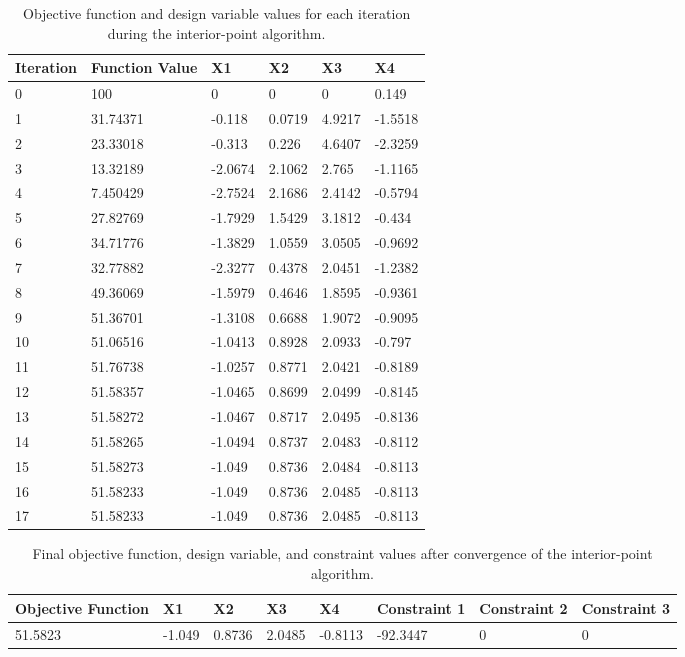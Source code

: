 \documentclass[11pt]{article}
\begin{document}
\begin{table}[htbp]
	\centering
    \begin{tabular}{|l|l|l|l|l|l|}
        \hline
        Iteration & Function Value & X1 & X2 & X3 & X4\\ \hline
0 & 100 & 0 & 0 & 0 & 0.149\\ 
1 & 31.74371 & -0.118 & 0.0719 & 4.9217 & -1.5518\\ 
2 & 23.33018 & -0.313 & 0.226 & 4.6407 & -2.3259\\ 
3 & 13.32189 & -2.0674 & 2.1062 & 2.765 & -1.1165\\ 
4 & 7.450429 & -2.7524 & 2.1686 & 2.4142 & -0.5794\\ 
5 & 27.82769 & -1.7929 & 1.5429 & 3.1812 & -0.434\\ 
6 & 34.71776 & -1.3829 & 1.0559 & 3.0505 & -0.9692\\ 
7 & 32.77882 & -2.3277 & 0.4378 & 2.0451 & -1.2382\\ 
8 & 49.36069 & -1.5979 & 0.4646 & 1.8595 & -0.9361\\ 
9 & 51.36701 & -1.3108 & 0.6688 & 1.9072 & -0.9095\\ 
10 & 51.06516 & -1.0413 & 0.8928 & 2.0933 & -0.797\\ 
11 & 51.76738 & -1.0257 & 0.8771 & 2.0421 & -0.8189\\ 
12 & 51.58357 & -1.0465 & 0.8699 & 2.0499 & -0.8145\\ 
13 & 51.58272 & -1.0467 & 0.8717 & 2.0495 & -0.8136\\ 
14 & 51.58265 & -1.0494 & 0.8737 & 2.0483 & -0.8112\\ 
15 & 51.58273 & -1.049 & 0.8736 & 2.0484 & -0.8113\\ 
16 & 51.58233 & -1.049 & 0.8736 & 2.0485 & -0.8113\\ 
17 & 51.58233 & -1.049 & 0.8736 & 2.0485 & -0.8113\\ 
        \hline
    \end{tabular}
	\caption{Objective function and design variable values for each iteration during the interior-point algorithm.}
	\label{Table1}
\end{table}

\begin{table}[htbp]
	\centering
    \begin{tabular}{|l|l|l|l|l|l|l|l|}
        \hline
	Objective Function & X1 & X2 & X3 & X4 & Constraint 1 & Constraint 2 & Constraint 3 \\ \hline
	51.5823 & -1.049 & 0.8736 & 2.0485 & -0.8113 & -92.3447 & 0 & 0 \\ 
	\hline
    \end{tabular}
	\caption{Final objective function, design variable, and constraint values after convergence of the interior-point algorithm.}
	\label{Table2}
\end{table}
\end{document}
